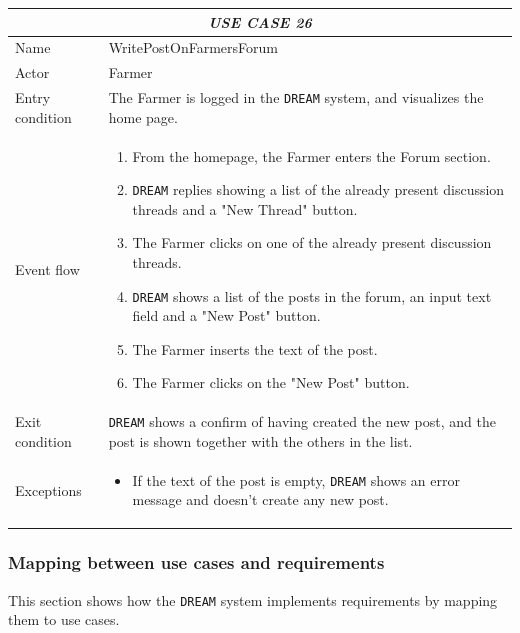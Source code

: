 \documentclass{article}
\begin{document}
\centering
\begin{longtable}{|p{3.5cm}|m{8cm}|}
 \hline
 \multicolumn{2}{|c|}{\cellcolor{white}\emph{USE CASE 26}} \\
 \endfirsthead
 \endhead
 \endfoot
 \endlastfoot
 \hline
 Name & WritePostOnFarmersForum\\
 \hline
 Actor & Farmer\\
 \hline
 Entry condition & The Farmer is logged in the \verb|DREAM| system, and visualizes the home page.\\
 \hline
 Event flow & \begin{enumerate}
    \item From the homepage, the Farmer enters the Forum section.
    \item \verb|DREAM| replies showing a list of the already present discussion threads and a "New Thread" button.
    \item The Farmer clicks on one of the already present discussion threads.
    \item \verb|DREAM| shows a list of the posts in the forum, an input text field and a "New Post" button.
    \item The Farmer inserts the text of the post.
    \item The Farmer clicks on the "New Post" button.
 \end{enumerate}\\
 \hline
 Exit condition & \verb|DREAM| shows a confirm of having created the new post, and the post is shown together with the others in the list.\\
 \hline
 Exceptions & \begin{itemize}
     \item If the text of the post is empty, \verb|DREAM| shows an error message and doesn't create any new post.
 \end{itemize}\\
 \hline
\end{longtable}

\subsubsection{Mapping between use cases and requirements}
This section shows how the \verb|DREAM| system implements requirements by mapping them to use cases.
\end{document}
